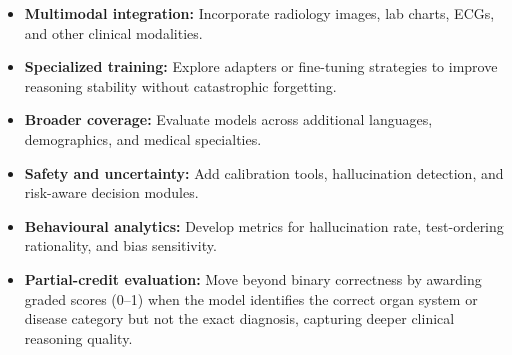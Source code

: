 \begin{itemize}
    \item \textbf{Multimodal integration:} Incorporate radiology images, lab charts, ECGs, and other clinical modalities.
    \item \textbf{Specialized training:} Explore adapters or fine-tuning strategies to improve reasoning stability without catastrophic forgetting.
    \item \textbf{Broader coverage:} Evaluate models across additional languages, demographics, and medical specialties.
    \item \textbf{Safety and uncertainty:} Add calibration tools, hallucination detection, and risk-aware decision modules.
    \item \textbf{Behavioural analytics:} Develop metrics for hallucination rate, test-ordering rationality, and bias sensitivity.

    \item \textbf{Partial-credit evaluation:} Move beyond binary correctness by awarding graded scores (0–1) when the model identifies the correct organ system or disease category but not the exact diagnosis, capturing deeper clinical reasoning quality.
\end{itemize}
